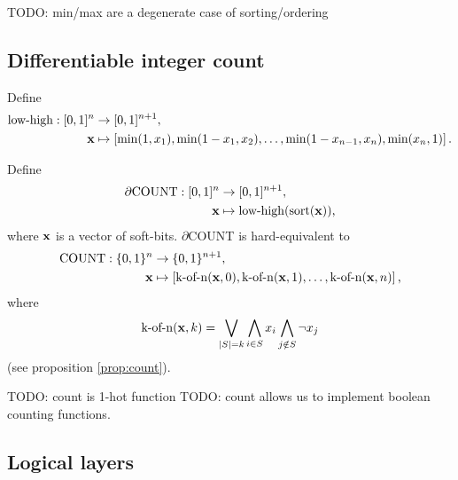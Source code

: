 \documentclass{article} %
\begin{document}
TODO: min/max are a degenerate case of sorting/ordering

\subsection{Differentiable integer count}

Define 
\begin{equation*}
\begin{aligned}
\operatorname{low-high}: [0,1]^{n} &\to [0,1]^{n+1},\\
{\bf x} &\mapsto \left[ \operatorname{min}(1, x_{1}), \operatorname{min}(1 - x_{1}, x_{2}), \dots, \operatorname{min}(1 - x_{n-1}, x_{n}), \operatorname{min}(x_{n}, 1) \right]\text{.}
\end{aligned}
\end{equation*}

Define
\begin{equation*}
\begin{aligned}
\partial\text{COUNT}: [0,1]^{n} &\to [0,1]^{n+1}, \\
{\bf x} &\mapsto \operatorname{low-high}(\operatorname{sort}({\bf x}))\text{,}
\end{aligned}
\end{equation*}
where ${\bf x}$ is a vector of soft-bits. $\partial${COUNT} is hard-equivalent to
\begin{equation*}
\begin{aligned}
\text{COUNT}: \{0,1\}^{n} &\to \{0,1\}^{n+1}, \\
{\bf x} &\mapsto \left[\operatorname{k-of-n}({\bf x}, 0), \operatorname{k-of-n}({\bf x}, 1), \dots, \operatorname{k-of-n}({\bf x}, n)\right]\text{,}
\end{aligned}
\end{equation*}
where
\begin{equation*}
\operatorname{k-of-n}({\bf x}, k) = \bigvee_{|S|=k} \bigwedge_{i\in S} x_i \bigwedge_{j\notin S} \neg x_j
\end{equation*}
(see proposition \ref{prop:count}).


TODO: count is 1-hot function
TODO: count allows us to implement boolean counting functions.

\subsection{Logical layers}
\end{document}
